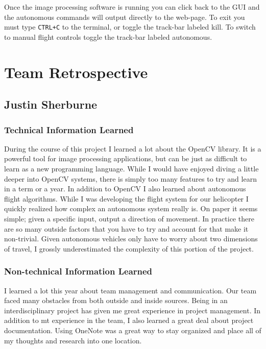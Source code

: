 \documentclass[onecolumn, draftclsnofoot,10pt, compsoc]{IEEEtran}
\begin{document}
Once the image processing software is running you can click back to the GUI and the autonomous commands will output directly to the web-page. To exit you must type \texttt{CTRL+C} to the terminal, or toggle the track-bar labeled kill. To switch to manual flight controls toggle the track-bar labeled autonomous.



\section{Team Retrospective}
\subsection{Justin Sherburne}

\subsubsection{Technical Information Learned} 
During the course of this project I learned a lot about the OpenCV library. It is a powerful tool for image processing applications, but can be just as difficult to learn as a new programming language. While I would have enjoyed diving a little deeper into OpenCV systems, there is simply too many features to try and learn in a term or a year. In addition to OpenCV I also learned about autonomous flight algorithms. While I was developing the flight system for our helicopter I quickly realized how complex an autonomous system really is. On paper it seems simple; given a specific input, output a direction of movement. In practice there are so many outside factors that you have to try and account for that make it non-trivial. Given autonomous vehicles only have to worry about two dimensions of travel, I grossly underestimated the complexity of this portion of the project.

\subsubsection{Non-technical Information Learned} 
I learned a lot this year about team management and communication. Our team faced many obstacles from both outside and inside sources. Being in an interdisciplinary project has given me great experience in project management. In addition to mt experience in the team, I also learned a great deal about project documentation. Using OneNote was a great way to stay organized and place all of my thoughts and research into one location. 
\end{document}
